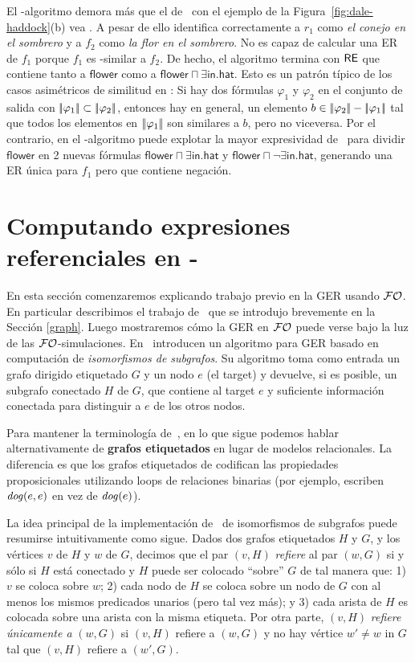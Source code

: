 El \el-algoritmo demora m\'as que el de \alc\ con el ejemplo de la Figura~\ref{fig:dale-haddock}(b) vea \cite{Stone1998a}. A pesar de ello
identifica correctamente a $r_1$ como \textit{el conejo en el sombrero} y a $ f_2$ como
\textit{la flor en el sombrero}. No es capaz de calcular una ER de $f_1$
porque $f_1$ es \el-similar a $f_2$. De hecho, el algoritmo
termina con $ \textsf{RE} $ que contiene tanto a $\mathsf{flower}$ como a
$\mathsf{flower} \sqcap \exists \mathsf{in}.\mathsf{hat}$. Esto es un
patr\'on t\'ipico de los casos asim\'etricos de similitud en \EL: Si hay
dos f\'ormulas $ \varphi_1 $ y $ \varphi_2$ en el conjunto de salida con
$|\!|\varphi_1|\!| \subset |\!|\varphi_2|\!|$, entonces hay
en general, un elemento $b \in |\!|\varphi_2|\!| -
|\!|\varphi_1|\!|$ tal que todos los elementos en $|\!|\varphi_1|\!| $ 
son similares a $ b $, pero no viceversa. Por el contrario, en el \alc-algoritmo puede explotar la mayor expresividad de \alc\ para dividir
$\mathsf{flower}$ en 2 nuevas f\'ormulas $\mathsf{flower} \sqcap
\exists \mathsf{in}.\mathsf{hat}$ y $\mathsf{flower} \sqcap \neg
\exists \mathsf{in}.\mathsf{hat}$, generando una ER \'unica para $f_1  $ pero que contiene negaci\'on.

\section{Computando expresiones referenciales en \FOL-}
\label{sec:computandoEnFOL}
En esta secci\'on comenzaremos explicando trabajo previo en la GER usando $\mathcal{FO}$. En particular describimos el trabajo de~\cite{graph} que se introdujo brevemente en la Secci\'on \ref{graph}. Luego mostraremos c\'omo la GER en $\mathcal{FO}$ puede verse bajo la luz de las $\mathcal{FO}$-simulaciones.
En~\cite{graph} introducen un algoritmo para GER basado en computaci\'on de \emph{isomorfismos de subgrafos}. Su algoritmo toma como entrada
un grafo dirigido etiquetado $G$ y un nodo $e$ (el target) y devuelve, si es posible,
un subgrafo conectado $H$ de $G$, que contiene al target $e$ y suficiente informaci\'on conectada para
distinguir a $e$ de los otros nodos.

Para mantener la terminolog\'ia de~\cite{graph}, en lo que sigue
podemos hablar alternativamente de \textbf{grafos etiquetados} en lugar de modelos relacionales. La diferencia es que los grafos etiquetados de \cite{graph} codifican las propiedades proposicionales utilizando
loops de relaciones binarias (por ejemplo, escriben $\mathit{dog}(e,e)$ en vez de $\mathit{dog}(e)$).

La idea principal de la implementaci\'on de~\cite{graph} de isomorfismos de subgrafos puede resumirse intuitivamente como sigue.
Dados dos grafos etiquetados $H$ y $G$, y los v\'ertices  $v$ de $H$
y $w$ de $G$, decimos que el par $(v, H)$ {\em refiere}
al par $(w, G)$ si y s\'olo si $H$ est\'a conectado y $H$ puede ser colocado ``sobre'' $G$ de tal manera que: 1) $v$ se coloca sobre $w$; 2) cada
nodo de $H$ se coloca sobre un nodo de $G$ con al menos los mismos
predicados unarios (pero tal vez m\'as); y 3) cada arista de $H$ es
colocada sobre una arista con la misma etiqueta. Por otra parte, $(v, H)$ {\em
refiere \'unicamente a} $(w, G)$ si $(v, H)$ refiere a $(w, G)$ y no hay
v\'ertice $w'\not=w$ in $G$ tal que $(v, H)$ refiere a $(w', G)$.


